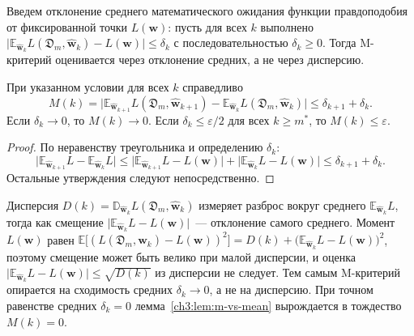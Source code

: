 Введем отклонение среднего математического ожидания функции правдоподобия от фиксированной точки $L(\mathbf{w})$: пусть для всех $k$ выполнено $\bigl|\mathbb{E}_{\hat{\mathbf{w}}_k}L(\mathfrak{D}_m,\hat{\mathbf{w}}_k)-L(\mathbf{w})\bigr|\le\delta_k$ с последовательностью $\delta_k\ge 0$. Тогда M-критерий оценивается через отклонение средних, а не через дисперсию.

\begin{lemma}\label{ch3:lem:m-vs-mean}
При указанном условии для всех $k$ справедливо
\begin{equation}\label{ch3:eq:m-vs-mean}
  M(k)=\bigl|\mathbb{E}_{\hat{\mathbf{w}}_{k+1}}L(\mathfrak{D}_m,\hat{\mathbf{w}}_{k+1})-\mathbb{E}_{\hat{\mathbf{w}}_{k}}L(\mathfrak{D}_m,\hat{\mathbf{w}}_{k})\bigr|
  \le\delta_{k+1}+\delta_k .
\end{equation}
Если $\delta_k\to 0$, то $M(k)\to 0$. Если $\delta_k\le\varepsilon/2$ для всех $k\ge m^*$, то $M(k)\le\varepsilon$.
\end{lemma}

\begin{proof}
По неравенству треугольника и определению $\delta_k$:
\[
  \bigl|\mathbb{E}_{\hat{\mathbf{w}}_{k+1}}L-\mathbb{E}_{\hat{\mathbf{w}}_{k}}L\bigr|
  \le\bigl|\mathbb{E}_{\hat{\mathbf{w}}_{k+1}}L-L(\mathbf{w})\bigr|+\bigl|\mathbb{E}_{\hat{\mathbf{w}}_{k}}L-L(\mathbf{w})\bigr|
  \le\delta_{k+1}+\delta_k .
\]
Остальные утверждения следуют непосредственно. \end{proof}

\begin{remark}\label{ch3:rem:m-vs-variance}
Дисперсия $D(k)=\mathbb{D}_{\hat{\mathbf{w}}_k}L(\mathfrak{D}_m,\hat{\mathbf{w}}_k)$ измеряет разброс вокруг среднего $\mathbb{E}_{\hat{\mathbf{w}}_k}L$, тогда как смещение $\bigl|\mathbb{E}_{\hat{\mathbf{w}}_k}L-L(\mathbf{w})\bigr|$~--- отклонение самого среднего. Момент $L(\mathbf{w})$ равен $\mathbb{E}\bigl[(L(\mathfrak{D}_m,\hat{\mathbf{w}}_k)-L(\mathbf{w}))^2\bigr]=D(k)+\bigl(\mathbb{E}_{\hat{\mathbf{w}}_k}L-L(\mathbf{w})\bigr)^2$, поэтому смещение может быть велико при малой дисперсии, и оценка $\bigl|\mathbb{E}_{\hat{\mathbf{w}}_k}L-L(\mathbf{w})\bigr|\le\sqrt{D(k)}$ из дисперсии не следует. Тем самым M-критерий опирается на сходимость средних $\delta_k\to 0$, а не на дисперсию. При точном равенстве средних $\delta_k=0$ лемма~\ref{ch3:lem:m-vs-mean} вырождается в тождество $M(k)=0$.
\end{remark}

